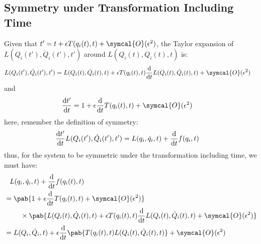 \subsection{Symmetry under Transformation Including Time}
Given that $t' = t + \epsilon T(q_i(t), t) + \symcal{O}(\epsilon^2)$,
the Taylor expansion of $L(Q_i(t'), \dot{Q}_i(t'), t')$ around $L(Q_i(t), \dot{Q}_i(t), t)$ is:
\begin{align}
  L(Q_i(t'), \dot{Q}_i(t'), t') & = L(Q_i(t), \dot{Q}_i(t), t) + \epsilon T(q_i(t), t) \odv{}{t} L(Q_i(t), \dot{Q}_i(t), t) + \symcal{O}(\epsilon^2)
\end{align}
and
\begin{align}
  \odv{t'}{t} & = 1 + \epsilon \odv{}{t} T(q_i(t), t) + \symcal{O}(\epsilon^2)
\end{align}
here, remember the definition of symmetry:
\begin{align}
  \odv{t'}{t} L(Q_i(t'), \dot{Q}_i(t'), t') & = L(q_i, \dot{q}_i, t) + \odv{}{t} f(q_i, t)
\end{align}
thus, for the system to be symmetric under the transformation including time, we must have:
\begin{align}
   & \phantom{=} L(q_i, \dot{q}_i, t) + \odv{}{t} f(q_i(t), t)                                                                                                                     \\
   & = \begin{multlined}[t]
         \pab{1 + \epsilon \odv{}{t} T(q_i(t), t) + \symcal{O}(\epsilon^2)} \\
         \times \pab{L(Q_i(t), \dot{Q}_i(t), t) + \epsilon T(q_i(t), t) \odv{}{t} L(Q_i(t), \dot{Q}_i(t), t) + \symcal{O}(\epsilon^2)}
       \end{multlined} \\
   & = L(Q_i, \dot{Q}_i, t) + \epsilon \odv{}{t} \pab{T(q_i(t), t)  L(Q_i(t), \dot{Q}_i(t), t)} + \symcal{O}(\epsilon^2)
\end{align}
